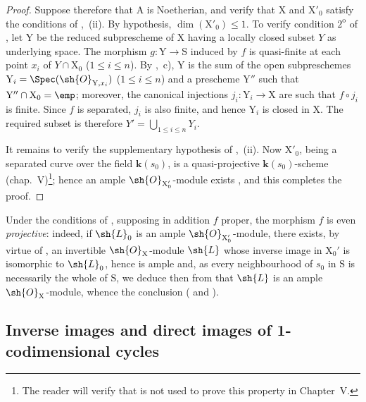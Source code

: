 \begin{proof}
Suppose therefore that $\mathrm{A}$ is Noetherian, and verify that $\mathrm{X}$ and $\mathrm{X}'_0$ satisfy the conditions of ,{}~(ii).
By hypothesis, $\dim(\mathrm{X}'_0)\leq1$.
To verify condition $2^{\mathrm{o}}$ of , let $\mathrm{Y}$ be the reduced subprescheme of $\mathrm{X}$ having a locally closed subset $Y$ as underlying space.
The morphism $g:\mathrm{Y}\to\mathrm{S}$ induced by $f$ is quasi-finite at each point $x_i$ of $Y\cap\mathrm{X}_0$ ($1\leq i\leq n$).
By ,{}~c), $\mathrm{Y}$ is the sum of the open subpreschemes $\mathrm{Y}_i=\Spec(\sh{O}_{\mathrm{Y},x_i})$ ($1\leq i\leq n$) and a prescheme $\mathrm{Y}''$ such that $\mathrm{Y}''\cap\mathrm{X}_0=\emp$; moreover, the canonical injections $j_i:\mathrm{Y}_i\to\mathrm{X}$ are such that $f\circ j_i$ is finite.
Since $f$ is separated, $j_i$ is also finite, and hence $\mathrm{Y}_i$ is closed in $\mathrm{X}$.
The required subset is therefore $Y'=\bigcup_{1\leq i\leq n}Y_i$.

It remains to verify the supplementary hypothesis of ,{}~(ii).
Now $\mathrm{X}'_0$, being a separated curve over the field $\boldsymbol{k}(s_0)$, is a quasi-projective $\boldsymbol{k}(s_0)$-scheme (chap.~V)\footnote{The reader will verify that  is not used to prove this property in Chapter~V.}; hence an ample $\sh{O}_{\mathrm{X}'_0}$-module exists , and this completes the proof.
\end{proof}

\begin{remark}[21.9.13]
\label{IV.21.9.13}
Under the conditions of , supposing in addition $f$ proper, the morphism $f$ is even \emph{projective}:
indeed, if $\sh{L}_0$ is an ample $\sh{O}_{\mathrm{X}'_0}$-module, there exists, by virtue of , an invertible $\sh{O}_\mathrm{X}$-module $\sh{L}$ whose inverse image in $\mathrm{X}_0'$ is isomorphic to $\sh{L}_0$, hence is ample and, as every neighbourhood of $s_0$ in $\mathrm{S}$ is necessarily the whole of $\mathrm{S}$, we deduce then from  that $\sh{L}$ is an ample $\sh{O}_\mathrm{X}$-module, whence the conclusion ( and ).
\end{remark}
\subsection{Inverse images and direct images of 1-codimensional cycles}
\label{subsection:IV.21.10}

